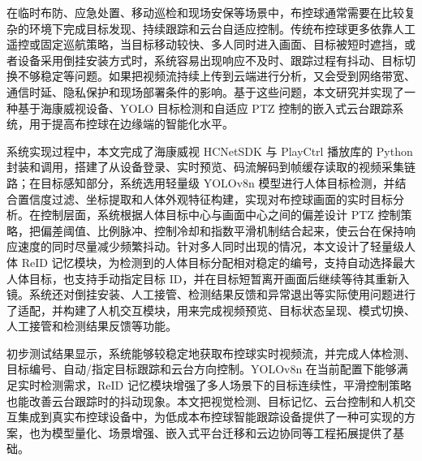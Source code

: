 \begin{cabstract}
在临时布防、应急处置、移动巡检和现场安保等场景中，布控球通常需要在比较复杂的环境下完成目标发现、持续跟踪和云台自适应控制。传统布控球更多依靠人工遥控或固定巡航策略，当目标移动较快、多人同时进入画面、目标被短时遮挡，或者设备采用倒挂安装方式时，系统容易出现响应不及时、跟踪过程有抖动、目标切换不够稳定等问题。如果把视频流持续上传到云端进行分析，又会受到网络带宽、通信时延、隐私保护和现场部署条件的影响。基于这些问题，本文研究并实现了一种基于海康威视设备、YOLO 目标检测和自适应 PTZ 控制的嵌入式云台跟踪系统，用于提高布控球在边缘端的智能化水平。

系统实现过程中，本文完成了海康威视 HCNetSDK 与 PlayCtrl 播放库的 Python 封装和调用，搭建了从设备登录、实时预览、码流解码到帧缓存读取的视频采集链路；在目标感知部分，系统选用轻量级 YOLOv8n 模型进行人体目标检测，并结合置信度过滤、坐标提取和人体外观特征构建，实现对布控球画面的实时目标分析。在控制层面，系统根据人体目标中心与画面中心之间的偏差设计 PTZ 控制策略，把偏差阈值、比例脉冲、控制冷却和指数平滑机制结合起来，使云台在保持响应速度的同时尽量减少频繁抖动。针对多人同时出现的情况，本文设计了轻量级人体 ReID 记忆模块，为检测到的人体目标分配相对稳定的编号，支持自动选择最大人体目标，也支持手动指定目标 ID，并在目标短暂离开画面后继续等待其重新入镜。系统还对倒挂安装、人工接管、检测结果反馈和异常退出等实际使用问题进行了适配，并构建了人机交互模块，用来完成视频预览、目标状态呈现、模式切换、人工接管和检测结果反馈等功能。

初步测试结果显示，系统能够较稳定地获取布控球实时视频流，并完成人体检测、目标编号、自动/指定目标跟踪和云台方向控制。YOLOv8n 在当前配置下能够满足实时检测需求，ReID 记忆模块增强了多人场景下的目标连续性，平滑控制策略也能改善云台跟踪时的抖动现象。本文把视觉检测、目标记忆、云台控制和人机交互集成到真实布控球设备中，为低成本布控球智能跟踪设备提供了一种可实现的方案，也为模型量化、场景增强、嵌入式平台迁移和云边协同等工程拓展提供了基础。
\end{cabstract}

